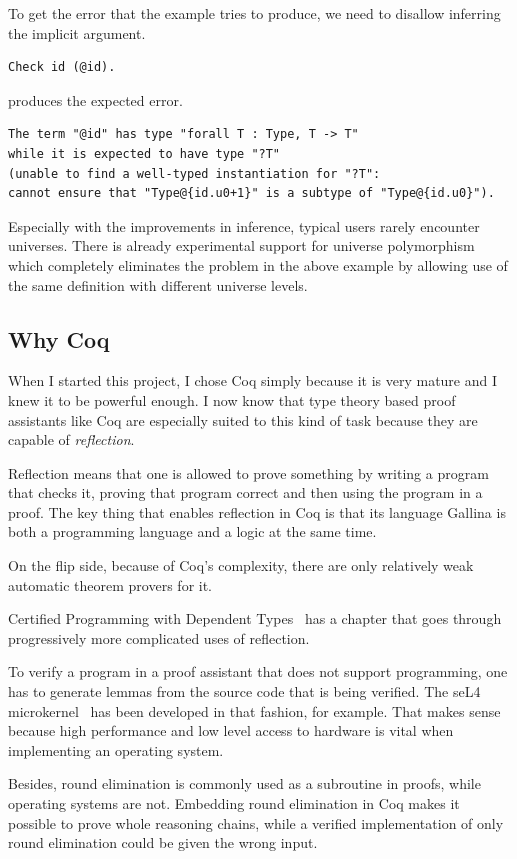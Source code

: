 \documentclass[english, 12pt, a4paper, sci, a-1b, online]{aaltothesis}
\begin{document}
To get the error that the example tries to produce, we need to disallow inferring the implicit argument.
\begin{verbatim}
Check id (@id).
\end{verbatim}
produces the expected error.
\begin{verbatim}
The term "@id" has type "forall T : Type, T -> T"
while it is expected to have type "?T"
(unable to find a well-typed instantiation for "?T":
cannot ensure that "Type@{id.u0+1}" is a subtype of "Type@{id.u0}").
\end{verbatim}

Especially with the improvements in inference, typical users rarely encounter universes. There is already experimental support for universe polymorphism~\cite{coqRefman} which completely eliminates the problem in the above example by allowing use of the same definition with different universe levels.

\subsection{Why Coq}

When I started this project, I chose Coq simply because it is very mature and I knew it to be powerful enough. I now know that type theory based proof assistants like Coq are especially suited to this kind of task because they are capable of \emph{reflection}.

Reflection means that one is allowed to prove something by writing a program that checks it, proving that program correct and then using the program in a proof. The key thing that enables reflection in Coq is that its language Gallina is both a programming language and a logic at the same time.

On the flip side, because of Coq's complexity, there are only relatively weak automatic theorem provers for it.

Certified Programming with Dependent Types~\cite{CPDT} has a chapter that goes through progressively more complicated uses of reflection.

To verify a program in a proof assistant that does not support programming, one has to generate lemmas from the source code that is being verified. The seL4 microkernel~\cite{sel4} has been developed in that fashion, for example. That makes sense because high performance and low level access to hardware is vital when implementing an operating system.

Besides, round elimination is commonly used as a subroutine in proofs, while operating systems are not. Embedding round elimination in Coq makes it possible to prove whole reasoning chains, while a verified implementation of only round elimination could be given the wrong input.
\end{document}
